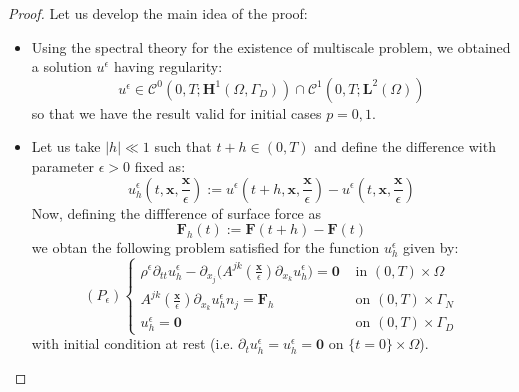 \begin{proof}
Let us develop the main idea of the proof:\\
\begin{itemize}
    \item Using the spectral theory for the existence of multiscale problem, we obtained a solution $u^{\epsilon}$ having regularity:
    \begin{equation*}
        u^{\epsilon} \in \mathcal{C}^0(0,T;\mathbf{H}^1(\Omega, \Gamma_D)) \cap \mathcal{C}^1(0,T;\mathbf{L}^2(\Omega))
    \end{equation*}
    so that we have the result valid for initial cases $p = 0, 1$.
    \item Let us take $\vert h \vert \ll 1$ such that $t+h \in (0,T)$ and define the difference with parameter $\epsilon > 0$ fixed as:
    \begin{equation*}
        u_h^{\epsilon}(t, \mathbf{x}, \frac{\mathbf{x}}{\epsilon}) := u^{\epsilon} (t+h, \mathbf{x}, \frac{\mathbf{x}}{\epsilon}) - u^{\epsilon}(t, \mathbf{x}, \frac{\mathbf{x}}{\epsilon})
    \end{equation*}
    Now, defining the diffference of surface force as
    \begin{equation*}
        \mathbf{F}_h(t):= \mathbf{F}(t+h) - \mathbf{F}(t)
    \end{equation*}
    we obtan the following problem satisfied for the function $u_h^{\epsilon}$ given by:
    \begin{equation*}
        (P_{\epsilon}) \left \{
        \begin{array}{cc}
            \rho^{\epsilon} \partial_{tt} u_h^{\epsilon} - \partial_{x_j} \big( A^{jk}(\frac{\mathbf{x}}{\epsilon}) \partial_{x_k} u_h^{\epsilon} \big) = \mathbf{0}  &  \text{ in } (0,T)\times \Omega \\
            A^{jk}(\frac{\mathbf{x}}{\epsilon}) \partial_{x_k} u_h^{\epsilon}n_j = \mathbf{F}_h & \text{ on } (0,T)\times \Gamma_N \\
            u^{\epsilon}_h = \mathbf{0} & \text{ on }(0,T)\times \Gamma_D
        \end{array}
        \right .
    \end{equation*}
    with initial condition at rest (i.e. $\partial_t u_h^{\epsilon} = u_h^{\epsilon} = \mathbf{0}$ on $\{t=0\} \times \Omega$).
    

\end{itemize}
\end{proof}
